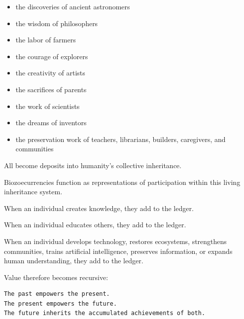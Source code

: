 ﻿\documentclass[12pt]{article}
\begin{document}
\begin{itemize}
  \item the discoveries of ancient astronomers
\end{itemize}
\begin{itemize}
  \item the wisdom of philosophers
\end{itemize}
\begin{itemize}
  \item the labor of farmers
\end{itemize}
\begin{itemize}
  \item the courage of explorers
\end{itemize}
\begin{itemize}
  \item the creativity of artists
\end{itemize}
\begin{itemize}
  \item the sacrifices of parents
\end{itemize}
\begin{itemize}
  \item the work of scientists
\end{itemize}
\begin{itemize}
  \item the dreams of inventors
\end{itemize}
\begin{itemize}
  \item the preservation work of teachers, librarians, builders, caregivers, and communities
\end{itemize}

All become deposits into humanity's collective inheritance.

Biozoecurrencies function as representations of participation within this living inheritance system.

When an individual creates knowledge, they add to the ledger.

When an individual educates others, they add to the ledger.

When an individual develops technology, restores ecosystems, strengthens communities, trains artificial intelligence, preserves information, or expands human understanding, they add to the ledger.

Value therefore becomes recursive:

\begin{verbatim}
The past empowers the present.
The present empowers the future.
The future inherits the accumulated achievements of both.
\end{verbatim}
\end{document}

